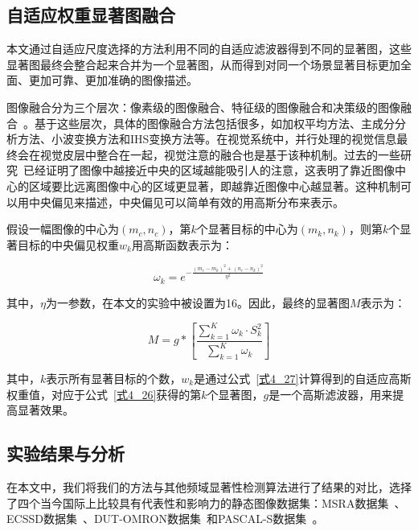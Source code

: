 \subsection{自适应权重显著图融合}
\label{4_2_3}

本文通过自适应尺度选择的方法利用不同的自适应滤波器得到不同的显著图，这些显著图最终会整合起来合并为一个显著图，从而得到对同一个场景显著目标更加全面、更加可靠、更加准确的图像描述。

图像融合分为三个层次：像素级的图像融合、特征级的图像融合和决策级的图像融合~\cite{吕超峰2007融合}。基于这些层次，具体的图像融合方法包括很多，如加权平均方法、主成分分析方法、小波变换方法和IHS变换方法等。在视觉系统中，并行处理的视觉信息最终会在视觉皮层中整合在一起，视觉注意的融合也是基于该种机制。过去的一些研究~\cite{JuddICCV2009Learning}已经证明了图像中越接近中央的区域越能吸引人的注意，这表明了靠近图像中心的区域要比远离图像中心的区域更显著，即越靠近图像中心越显著。这种机制可以用中央偏见来描述，中央偏见可以简单有效的用高斯分布来表示。

假设一幅图像的中心为$(m_{c},n_{c})$，第$k$个显著目标的中心为$(m_{k},n_{k})$，则第$k$个显著目标的中央偏见权重$w_{k}$用高斯函数表示为：
\begin{linenomath}
\begin{equation}
\omega_k=e^{-\frac{(m_{c}-m_{k})^{2}+(n_{c}-n_{k})^{2}}{\eta ^{2}}}
\label{式4_27}
\end{equation}
\end{linenomath}
其中，$\eta$为一参数，在本文的实验中被设置为16。因此，最终的显著图$M$表示为：
\begin{linenomath}
\begin{equation}
M=g\ast \left[\frac{\sum_{k=1}^{K}\omega_{k}\cdot S_{k}^{2}}{\sum_{k=1}^{K}\omega_{k}}\right]
\label{式4_28}
\end{equation}
\end{linenomath}
其中，$k$表示所有显著目标的个数，$w_{k}$是通过公式~\ref{式4_27}计算得到的自适应高斯权重值，对应于公式~\ref{式4_26}获得的第$k$个显著图，$g$是一个高斯滤波器，用来提高显著效果。

\subsection{实验结果与分析}
\label{4_2_4}

在本文中，我们将我们的方法与其他频域显著性检测算法进行了结果的对比，选择了四个当今国际上比较具有代表性和影响力的静态图像数据集：MSRA数据集~\cite{LiuTieCVPR2007Learning}、ECSSD数据集~\cite{YanQiongCVPR2013Hierarchical}、DUT-OMRON数据集~\cite{YangChuanCVPR2013Manifold}和PASCAL-S数据集~\cite{LiYinCVPR2014Secrets}。

